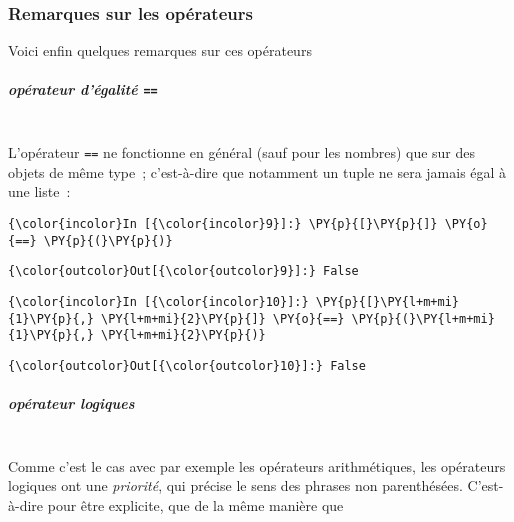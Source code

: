     \hypertarget{remarques-sur-les-opuxe9rateurs}{%
\subsubsection{Remarques sur les
opérateurs}\label{remarques-sur-les-opuxe9rateurs}}

    Voici enfin quelques remarques sur ces opérateurs

    \hypertarget{opuxe9rateur-duxe9galituxe9}{%
\subparagraph{\texorpdfstring{opérateur d'égalité
\texttt{==}\\\\}{opérateur d'égalité ==}}\label{opuxe9rateur-duxe9galituxe9}}

    L'opérateur \texttt{==} ne fonctionne en général (sauf pour les nombres)
que sur des objets de même type~; c'est-à-dire que notamment un tuple ne
sera jamais égal à une liste~:

    \begin{Verbatim}[commandchars=\\\{\}]
{\color{incolor}In [{\color{incolor}9}]:} \PY{p}{[}\PY{p}{]} \PY{o}{==} \PY{p}{(}\PY{p}{)}
\end{Verbatim}


\begin{Verbatim}[commandchars=\\\{\}]
{\color{outcolor}Out[{\color{outcolor}9}]:} False
\end{Verbatim}
            
    \begin{Verbatim}[commandchars=\\\{\}]
{\color{incolor}In [{\color{incolor}10}]:} \PY{p}{[}\PY{l+m+mi}{1}\PY{p}{,} \PY{l+m+mi}{2}\PY{p}{]} \PY{o}{==} \PY{p}{(}\PY{l+m+mi}{1}\PY{p}{,} \PY{l+m+mi}{2}\PY{p}{)}
\end{Verbatim}


\begin{Verbatim}[commandchars=\\\{\}]
{\color{outcolor}Out[{\color{outcolor}10}]:} False
\end{Verbatim}
            
    \hypertarget{opuxe9rateur-logiques}{%
\subparagraph{opérateur logiques\\\\}\label{opuxe9rateur-logiques}}

    Comme c'est le cas avec par exemple les opérateurs arithmétiques, les
opérateurs logiques ont une \emph{priorité}, qui précise le sens des
phrases non parenthésées. C'est-à-dire pour être explicite, que de la
même manière que


